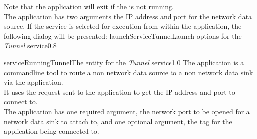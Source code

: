 Note that the application will exit if the  is not
running.\\

The application has two arguments \longDash{} the IP address and port for the network data
source.
\insertAutoAppParameters
{}
\condPage
If the service is selected for execution from within the \emph{\MMMU} application, the
following dialog will be presented:
%
{launchServiceTunnel}{Launch options for the \emph{Tunnel} service}{0.8}

%
{serviceRunningTunnel}{The \emph{\MMMU} entity for the \emph{Tunnel} service}{1.0}
\condPage
{}
The  application is a command\longDash{}line tool to route a
non\longDash\yarp{} network data source to a non\longDash\yarp{} network data sink via
the  application.\\

It uses the  request sent to the
 application to get the IP address and port to connect
to.\\

The application has one required argument, the network port to be opened for a network
data sink to attach to, and one optional argument, the tag for the
 application being connected to.
\insertShortClientParameters
{}
\secondaryEnd
\primaryEnd{}
